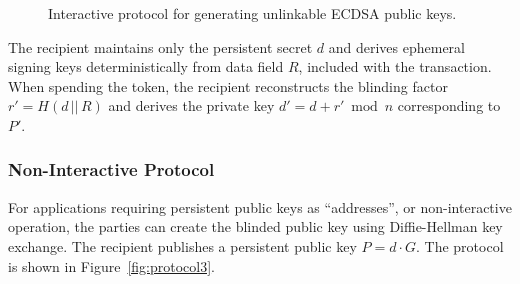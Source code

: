 \documentclass{article}
\begin{document}
\begin{figure}[!htb]
\centering
{}
\caption{Interactive protocol for generating unlinkable ECDSA public keys.}
\label{fig:protocol1}
\end{figure}

The recipient maintains only the persistent secret $d$ and derives ephemeral signing keys deterministically from data field $R$, included with the transaction. When spending the token, the recipient reconstructs the blinding factor $r' = H(d \,||\, R)$ and derives the private key $d' = d + r' \bmod n$ corresponding to $P'$.

\subsubsection{Non-Interactive Protocol}

For applications requiring persistent public keys as ``addresses'', or non-interactive operation, the parties can create the blinded public key using Diffie-Hellman key exchange. The recipient publishes a persistent public key $P = d \cdot G$. The protocol is shown in Figure~\ref{fig:protocol3}.
\end{document}
